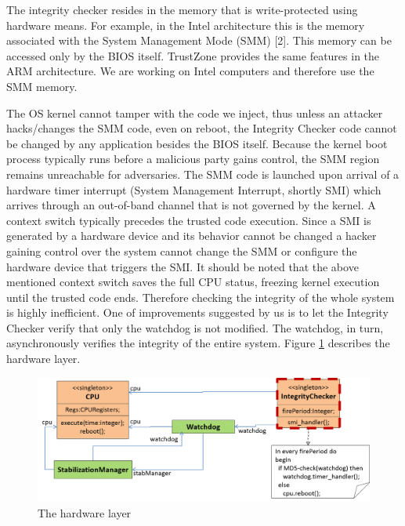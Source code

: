 The integrity checker resides in the memory that is write-protected
using hardware means. For example, in the Intel architecture this
is the memory associated with the System Management Mode (SMM) {[}2{]}.
This memory can be accessed only by the BIOS itself. TrustZone \cite{trust-zone}
provides the same features in the ARM architecture. We are working
on Intel computers and therefore use the SMM memory.

The OS kernel cannot tamper with the code we inject, thus unless an
attacker hacks/changes the SMM code, even on reboot, the Integrity
Checker code cannot be changed by any application besides the BIOS
itself. Because the kernel boot process typically runs before a malicious
party gains control, the SMM region remains unreachable for adversaries.
The SMM code is launched upon arrival of a hardware timer interrupt
(System Management Interrupt, shortly SMI) which arrives through an
out-of-band channel that is not governed by the kernel. A context
switch typically precedes the trusted code execution. Since a SMI
is generated by a hardware device and its behavior cannot be changed
a hacker gaining control over the system cannot change the SMM or
configure the hardware device that triggers the SMI. It should be
noted that the above mentioned context switch saves the full CPU status,
freezing kernel execution until the trusted code ends. Therefore checking
the integrity of the whole system is highly inefficient. One of improvements
suggested by us is to let the Integrity Checker verify that only the
watchdog is not modified. The watchdog, in turn, asynchronously verifies
the integrity of the entire system. Figure \ref{fig:The-hardware-layer}
describes the hardware layer. 

\begin{figure}
\begin{centering}
\includegraphics[width=12cm]{pictures/hardware}
\par\end{centering}

\caption{\label{fig:The-hardware-layer}The hardware layer}
\end{figure}



